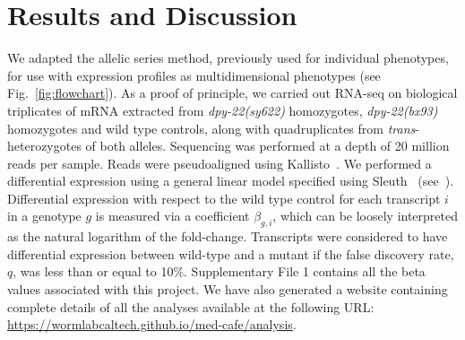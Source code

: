 \documentclass[8pt, twocolumn]{article}
\newcommand{\gene}[1]{\mbox{\emph{#1}}}
\newcommand{\dpy}[1]{\gene{dpy-22#1}}
\newcommand{\bx}{\dpy{(bx93)}}
\newcommand{\sy}{\dpy{(sy622)}}
\begin{document}
\section*{Results and Discussion}
We adapted the allelic series method, previously used for individual phenotypes,
for use with expression profiles as multidimensional phenotypes (see
Fig.~\ref{fig:flowchart}). As a proof of principle, we carried out RNA-seq on
biological triplicates of mRNA extracted from \sy{} homozygotes, \bx{}
homozygotes and wild type controls, along with quadruplicates from
\emph{trans}-heterozygotes of both alleles. Sequencing was performed at a depth
of 20 million reads per sample. Reads were pseudoaligned using
Kallisto~\cite{Bray2016}. We performed a differential expression using a general
linear model specified using Sleuth~\cite{Pimentel2016a}
(see~). Differential expression with respect to the wild
type control for each transcript $i$ in a genotype $g$ is measured via a
coefficient $\beta_{g, i}$, which can be loosely interpreted as the natural
logarithm of the fold-change. Transcripts were considered to have differential
expression between wild-type and a mutant if the false discovery rate, $q$, was
less than or equal to 10\%. Supplementary File 1 contains all the beta values
associated with this project. We have also generated a website containing
complete details of all the analyses available at the following URL:
\url{https://wormlabcaltech.github.io/med-cafe/analysis}.
\end{document}
